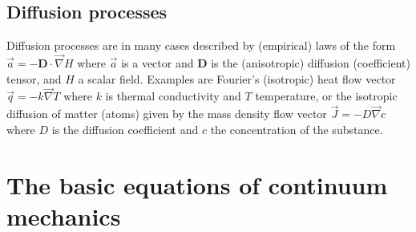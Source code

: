 \vspace{0.5cm}
\vspace{0.5cm}

\subsection{Diffusion processes} 

Diffusion processes are in many cases described by (empirical) 
laws of the form $\vec{a} = -{\bm D} \cdot \vec\nabla H$
where $\vec{a}$ is a vector and ${\bm D}$ 
is the (anisotropic) diffusion (coefficient) tensor,
and $H$ a scalar field. 
Examples are Fourier’s (isotropic) heat flow vector 
$\vec{q} = -k \vec\nabla T$
where $k$ is thermal conductivity and $T$ temperature, 
or the isotropic diffusion of matter
(atoms) given by the mass density flow vector $\vec{J} = -D \vec\nabla c$
where $D$ is the diffusion
coefficient and $c$ the concentration of the substance.


\section{The basic equations of continuum mechanics}

